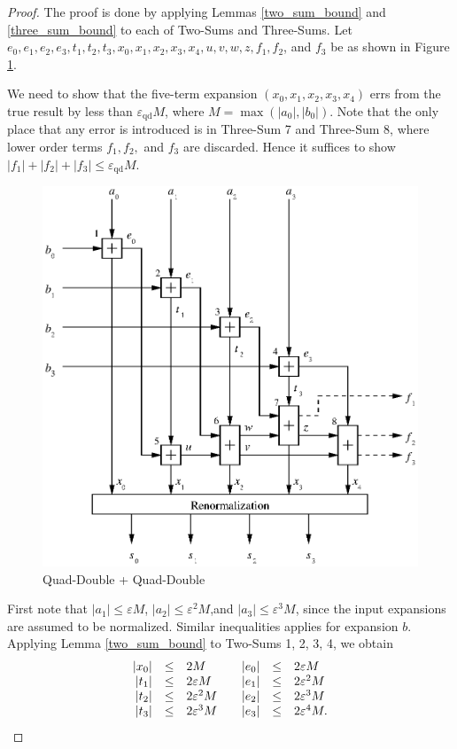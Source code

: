 \documentclass[11pt]{article}
\theoremstyle{definition}
\newcommand{\eps}{\varepsilon}
\newcommand{\epsqd}{\varepsilon_\mathrm{qd}}
\begin{document}
\begin{proof}
  The proof is done by applying Lemmas \ref{two_sum_bound} and 
\ref{three_sum_bound} to each of {\sc Two-Sum}s and {\sc Three-Sum}s.
Let $e_0, e_1, e_2, e_3, t_1, t_2, t_3, x_0, x_1, x_2, x_3, x_4, u, v, 
w, z, f_1, f_2$, and $f_3$ be as shown in Figure \ref{qd_add_proof_fig}.

We need to show
that the five-term expansion $(x_0, x_1, x_2, x_3, x_4)$ errs from the
true result by less than $\epsqd M$, where $M = \max(|a_0|, |b_0|)$.
Note that the only place that any error is introduced is in {\sc Three-Sum} 7
and {\sc Three-Sum} 8, where lower order terms $f_1, f_2,$ and $f_3$ are discarded.  
Hence it suffices to show $|f_1| + |f_2| + |f_3| \le \epsqd M$.

\begin{figure}[h]
  \begin{center} 
    \includegraphics{qd_add_proof.eps}
    \caption{\label{qd_add_proof_fig}Quad-Double + Quad-Double}
  \end{center}
\end{figure}

First note that $|a_1| \le \eps M$, $|a_2| \le \eps^2 M$,and 
$|a_3| \le \eps^3 M$, since the input expansions are assumed to be 
normalized.  Similar inequalities applies for expansion $b$.
Applying Lemma \ref{two_sum_bound} to {\sc Two-Sum}s 1, 2, 3, 4, we obtain
\begin{displaymath}
  \begin{array}{rcl@{\qquad}rcl}
    |x_0| &\le& 2M & |e_0| &\le& 2\eps M\\
    |t_1| &\le& 2\eps M   & |e_1| &\le& 2\eps^2 M\\
    |t_2| &\le& 2\eps^2 M & |e_2| &\le& 2\eps^3 M\\
    |t_3| &\le& 2\eps^3 M & |e_3| &\le& 2\eps^4 M.
  \end{array}
\end{displaymath}


\end{proof}
\end{document}
